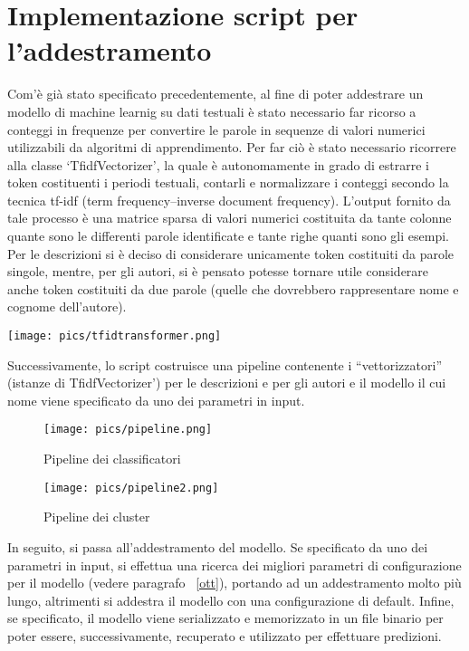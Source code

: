 \documentclass[12pt,oneside]{article}
\begin{document}
\section{Implementazione script per l'addestramento}
    \begin{justify}
        Com’è già stato specificato precedentemente, al fine di poter addestrare un modello di machine learnig su dati testuali è stato necessario far ricorso a conteggi in frequenze per convertire le parole in sequenze di valori numerici utilizzabili da algoritmi di apprendimento. Per far ciò è stato necessario ricorrere alla classe ‘TfidfVectorizer’, la quale è autonomamente in grado di estrarre i token costituenti i periodi testuali, contarli e normalizzare i conteggi secondo la tecnica tf-idf (term frequency–inverse document frequency). L’output fornito  da tale processo è una matrice sparsa di valori numerici costituita da tante colonne quante sono le differenti parole identificate e tante righe quanti sono gli esempi. Per le descrizioni si è deciso di considerare unicamente token costituiti da parole singole, mentre, per gli autori, si è pensato potesse tornare utile considerare anche token costituiti da due parole (quelle che dovrebbero rappresentare nome e cognome dell’autore).
        \end{justify}

        \texttt{[image: pics/tfidtransformer.png]}
        
        \begin{justify}
        Successivamente, lo script costruisce una pipeline contenente i “vettorizzatori” (istanze di TfidfVectorizer’) per le descrizioni e per gli autori e il modello il cui nome viene specificato da uno dei parametri in input.
        \end{justify}

        \begin{figure}[H]
        \texttt{[image: pics/pipeline.png]}
        \caption{Pipeline dei classificatori}
        \end{figure}

        \begin{figure}[H]
        \texttt{[image: pics/pipeline2.png]}
        \caption{Pipeline dei cluster}
        \end{figure}
        
        \begin{justify}
        In seguito, si passa all’addestramento del modello. Se specificato da uno dei parametri in input, si effettua una ricerca dei migliori parametri di configurazione per il modello (vedere paragrafo ~\ref{ott}), portando ad un addestramento molto più lungo, altrimenti si addestra il modello con una configurazione di default. Infine, se specificato, il modello viene serializzato e memorizzato in un file binario per poter essere, successivamente, recuperato e utilizzato per effettuare predizioni.
        \end{justify}
    
\end{document}
